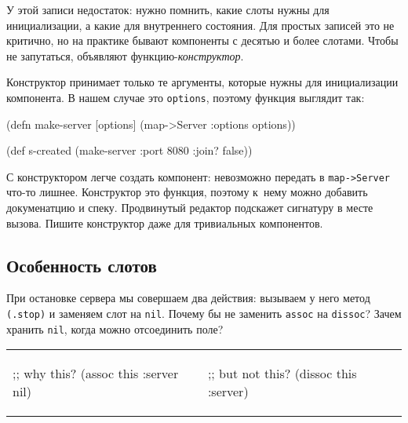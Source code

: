 
У этой записи недостаток: нужно помнить, какие слоты нужны для инициализации, а
какие для внутреннего состояния. Для простых записей это не критично, но на
практике бывают компоненты с десятью и более слотами. Чтобы не запутаться,
объявляют функцию-\emph{конструктор}.

Конструктор принимает только те аргументы, которые нужны для инициализации
компонента. В нашем случае это \verb|options|, поэтому функция выглядит так:

\begin{english}
  \begin{clojure}
(defn make-server
  [options]
  (map->Server {:options options}))

(def s-created (make-server {:port 8080 :join? false}))
  \end{clojure}
\end{english}

С конструктором легче создать компонент: невозможно передать в
\verb|map->Server| что-то лишнее. Конструктор это функция, поэтому к~нему можно
добавить докуменатцию и спеку. Продвинутый редактор подскажет сигнатуру в месте
вызова. Пишите конструктор даже для тривиальных компонентов.

\subsection{Особенность слотов}

При остановке сервера мы совершаем два действия: вызываем у него метод
\verb|(.stop)| и заменяем слот на \verb|nil|. Почему бы не заменить
\verb|assoc| на \verb|dissoc|? Зачем хранить \verb|nil|, когда можно
отсоединить поле?

\noindent
\begin{tabular}{ @{}p{5cm} @{}p{5cm} }

\begin{english}
  \begin{clojure}
;; why this?
(assoc this :server nil)
  \end{clojure}
\end{english}

&

\begin{english}
  \begin{clojure}
;; but not this?
(dissoc this :server)
  \end{clojure}
\end{english}

\end{tabular}

